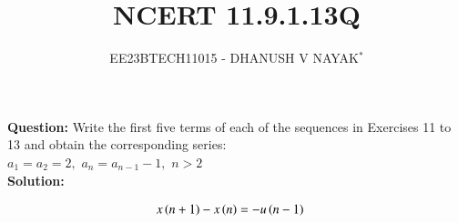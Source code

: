 \documentclass[journal,12pt,twocolumn]{IEEEtran}
\theoremstyle{remark}
\begin{document}

\title{NCERT 11.9.1.13Q}
\author{EE23BTECH11015 - DHANUSH V NAYAK$^{*}$%
}
\maketitle
\newpage
\bigskip
\renewcommand{\thefigure}{\arabic{figure}}
\renewcommand{\thetable}{\theenumi}
\textbf{Question:} Write the first five terms of each of the sequences in Exercises 11 to 13 and obtain the corresponding series:\\
$a_1=a_2=2,$\hspace{5pt} $a_n=a_{n-1} -1,$\hspace{5pt} $n>2$\\
\textbf{Solution:}

\begin{align}
    x\left(n+1\right) - x\left(n\right) &= -u\left(n-1\right) \label{eq:11.9.1.13.1}
\end{align}
\end{document}
